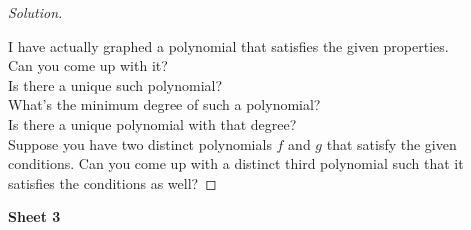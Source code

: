 \documentclass[12pt]{article}
\theoremstyle{definition}
\newenvironment{soln}{\begin{proof}[Solution]}{\end{proof}}
\begin{document}
\begin{itemize}
\begin{soln}
\begin{center}
	\end{center}
		I have actually graphed a polynomial that satisfies the given properties.\\
		Can you come up with it?\\
		Is there a unique such polynomial?\\
		What's the minimum degree of such a polynomial?\\
		Is there a unique polynomial with that degree?\\
		Suppose you have two distinct polynomials $f$ and $g$ that satisfy the given conditions. Can you come up with a distinct third polynomial such that it satisfies the conditions as well?
	\end{soln}
\end{itemize}
\newpage
\textbf{Sheet 3}
\end{document}
